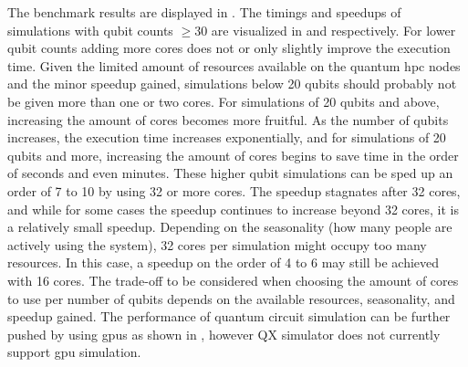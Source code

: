 The benchmark results are displayed in .
The timings and speedups of simulations with qubit counts $\ge 30$ are visualized in  and  respectively.
For lower qubit counts adding more cores does not or only slightly improve the execution time.
Given the limited amount of resources available on the quantum \gls{hpc} nodes and the minor speedup gained, simulations below 20 qubits should probably not be given more than one or two cores.
For simulations of 20 qubits and above, increasing the amount of cores becomes more fruitful.
As the number of qubits increases, the execution time increases exponentially, and for simulations of 20 qubits and more, increasing the amount of cores begins to save time in the order of seconds and even minutes.
These higher qubit simulations can be sped up an order of 7 to 10 by using 32 or more cores.
The speedup stagnates after 32 cores, and while for some cases the speedup continues to increase beyond 32 cores, it is a relatively small speedup.
Depending on the seasonality (how many people are actively using the system), 32 cores per simulation might occupy too many resources.
In this case, a speedup on the order of 4 to 6 may still be achieved with 16 cores.
The trade-off to be considered when choosing the amount of cores to use per number of qubits depends on the available resources, seasonality, and speedup gained.
The performance of quantum circuit simulation can be further pushed by using \glspl{gpu} as shown in \cite[Appendix B]{oud2019simulation}, however QX simulator does not currently support \gls{gpu} simulation.

\clearpage

